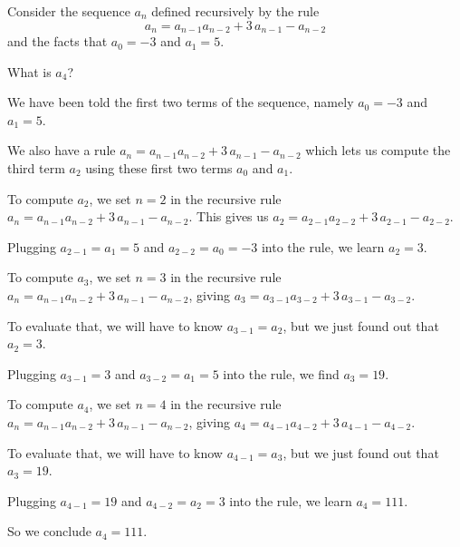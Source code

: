 \documentclass{ximera}
\begin{document}
\begin{question}
  Consider the sequence \(a_{n}\) defined recursively by the
  rule \[a_n = {a_{n-1}} {a_{n-2}} + 3 \, {a_{n-1}} - {a_{n-2}}\] and
  the facts that \(a_0 = -3\) and \(a_1 = 5\).

  What is \(a_4\)?

  \begin{solution}
    \begin{hint}
      We have been told the first two terms of the sequence, namely \(a_0 = -3\) and \(a_1 = 5\).
    \end{hint}
    \begin{hint}
      We also have a rule \(a_n = {a_{n-1}} {a_{n-2}} + 3 \, {a_{n-1}} - {a_{n-2}}\) which lets us compute the third term \(a_2\) using these first two terms \(a_0\) and \(a_1\).
    \end{hint}
    \begin{hint}
      To compute \(a_2\), we set \(n = 2\) in the recursive rule \(a_n = {a_{n-1}} {a_{n-2}} + 3 \, {a_{n-1}} - {a_{n-2}}\).  This gives us \(a_2 = {a_{2-1}} {a_{2-2}} + 3 \, {a_{2-1}} - {a_{2-2}}\).
    \end{hint}
    \begin{hint}
      Plugging \(a_{2-1} = a_{1} = 5\) and \(a_{2-2} = a_{0} = -3\) into the rule, we learn \(a_2 = 3\).
    \end{hint}
    \begin{hint}
      To compute \(a_3\), we set \(n = 3\) in the recursive rule \(a_n = {a_{n-1}} {a_{n-2}} + 3 \, {a_{n-1}} - {a_{n-2}}\), giving \(a_3 = {a_{3-1}} {a_{3-2}} + 3 \, {a_{3-1}} - {a_{3-2}}\).
    \end{hint}
    \begin{hint}
      To evaluate that, we will have to know \(a_{3-1} = a_{2}\), but we just found out that \(a_{2} = 3\).
    \end{hint}
    \begin{hint}
      Plugging \(a_{3-1} = 3\) and \(a_{3-2} = a_{1} = 5\) into the rule, we find \(a_3 = 19\).
    \end{hint}
    \begin{hint}
      To compute \(a_4\), we set \(n = 4\) in the recursive rule \(a_n = {a_{n-1}} {a_{n-2}} + 3 \, {a_{n-1}} - {a_{n-2}}\), giving \(a_4 = {a_{4-1}} {a_{4-2}} + 3 \, {a_{4-1}} - {a_{4-2}}\).
    \end{hint}
    \begin{hint}
      To evaluate that, we will have to know \(a_{4-1} = a_{3}\), but we just found out that \(a_{3} = 19\).
    \end{hint}
    \begin{hint}
      Plugging \(a_{4-1} = 19\) and \(a_{4-2} = a_{2} = 3\) into the rule, we learn \(a_4 = 111\).
    \end{hint}
    \begin{hint}
      So we conclude \(a_4 = 111\).
    \end{hint}


\end{solution}
\end{question}
\end{document}
